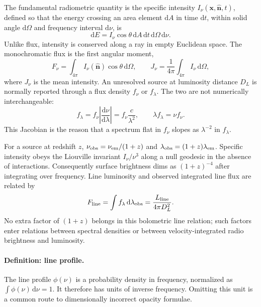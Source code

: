 The fundamental radiometric quantity is the specific intensity
$I_\nu(\boldsymbol{x},\hat{\boldsymbol{n}},t)$, defined so that the energy crossing an
area element $\mathrm{d}A$ in time $\mathrm{d}t$, within solid angle
$\mathrm{d}\Omega$ and frequency interval $\mathrm{d}\nu$, is
\begin{equation}
 \mathrm{d}E = I_\nu\cos\theta\,\mathrm{d}A\,\mathrm{d}t\,
              \mathrm{d}\Omega\,\mathrm{d}\nu .
 \label{eq:rt-intensity-definition}
\end{equation}
Unlike flux, intensity is conserved along a ray in empty Euclidean space.  The
monochromatic flux is the first angular moment,
\begin{equation}
 F_\nu = \int_{4\pi} I_\nu(\hat{\boldsymbol{n}})\cos\theta\,\mathrm{d}\Omega ,
 \qquad
 J_\nu = \frac{1}{4\pi}\int_{4\pi}I_\nu\,\mathrm{d}\Omega ,
 \label{eq:rt-moments}
\end{equation}
where $J_\nu$ is the mean intensity.  An unresolved source at luminosity distance
$D_L$ is normally reported through a flux density $f_\nu$ or $f_\lambda$.  The two
are not numerically interchangeable:
\begin{equation}
 f_\lambda = f_\nu\left|\frac{\mathrm{d}\nu}{\mathrm{d}\lambda}\right|
 = f_\nu\frac{c}{\lambda^2},
 \qquad \lambda f_\lambda=\nu f_\nu .
 \label{eq:fnu-flambda}
\end{equation}
This Jacobian is the reason that a spectrum flat in $f_\nu$ slopes as
$\lambda^{-2}$ in $f_\lambda$.

For a source at redshift $z$, $\nu_{\rm obs}=\nu_{\rm em}/(1+z)$ and
$\lambda_{\rm obs}=(1+z)\lambda_{\rm em}$.  Specific intensity obeys the
Liouville invariant $I_\nu/\nu^3$ along a null geodesic in the absence of
interactions.  Consequently surface brightness dims as $(1+z)^{-4}$ after
integrating over frequency.  Line luminosity and observed integrated line flux are
related by
\begin{equation}
 F_{\rm line}=\int f_\lambda\,\mathrm{d}\lambda_{\rm obs}
             =\frac{L_{\rm line}}{4\pi D_L^2}.
 \label{eq:line-flux-luminosity}
\end{equation}
No extra factor of $(1+z)$ belongs in this bolometric line relation; such factors
enter relations between spectral densities or between velocity-integrated radio
brightness and luminosity.

\paragraph{Definition: line profile.}
The line profile $\phi(\nu)$ is a probability density in frequency, normalized as
$\int\phi(\nu)\,\mathrm{d}\nu=1$.  It therefore has units of inverse frequency.
Omitting this unit is a common route to dimensionally incorrect opacity formulae.

